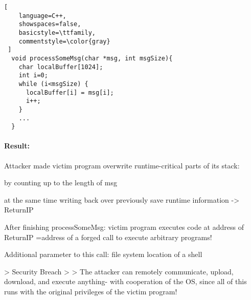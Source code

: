 \documentclass[a4paper]{article}
\begin{document}
\begin{multicols}{3}
    \begin{lstlisting}[
    language=C++,
    showspaces=false,
    basicstyle=\ttfamily,
    commentstyle=\color{gray}
 ]
  void processSomeMsg(char *msg, int msgSize){ 
    char localBuffer[1024];
    int i=0;
    while (i<msgSize) {
      localBuffer[i] = msg[i];
      i++;
    }
    ...
  }
  \end{lstlisting}

    \paragraph{Result:}
    \begin{itemize*}
        \item Attacker made victim program overwrite runtime-critical parts of its stack:
              \begin{itemize*}
                  \item by counting up to the length of msg
                  \item at the same time writing back over previously save runtime information ->  ReturnIP
              \end{itemize*}
        \item After finishing processSomeMsg: victim program executes code at address of ReturnIP =address of a forged call to execute arbitrary programs!
        \item Additional parameter to this call: file system location of a shell
    \end{itemize*}

    > Security Breach
    >
    > The attacker can remotely communicate, upload, download, and execute anything- with cooperation of the OS, since all of this runs with the original privileges of the victim program!



\end{multicols}
\end{document}
